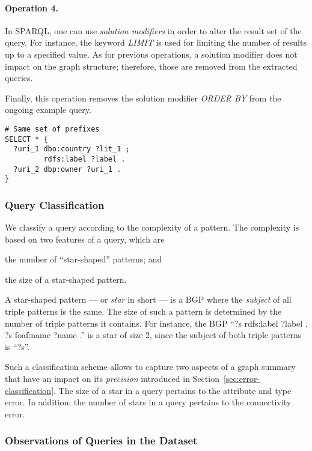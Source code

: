 \paragraph{Operation 4.}

In SPARQL, one can use \emph{solution modifiers} in order to alter the result set of the query. For instance, the keyword \emph{LIMIT} is used for limiting the number of results up to a specified value. As for previous operations, a solution modifier does not impact on the graph structure; therefore, those are removed from the extracted queries.

Finally, this operation removes the solution modifier \emph{ORDER BY} from the ongoing example query.
\begin{verbatim}
# Same set of prefixes
SELECT * {
  ?uri_1 dbo:country ?lit_1 ;
         rdfs:label ?label .
  ?uri_2 dbp:owner ?uri_1 .
}
\end{verbatim}

\subsubsection{Query Classification}

We classify a query according to the complexity of a pattern. The complexity is based on two features of a query, which are
\begin{inparaenum}[(i)]
	\item the number of ``star-shaped'' patterns; and
	\item the size of a star-shaped pattern.
\end{inparaenum}

A star-shaped pattern --- or \emph{star} in short --- is a BGP where the \emph{subject} of all triple patterns is the same. The size of such a pattern is determined by the number of triple patterns it contains. For instance, the BGP ``?s rdfs:label ?label . ?s foaf:name ?name .'' is a star of size 2, since the subject of both triple patterns is ``?s''.

Such a classification scheme allows to capture two aspects of a graph summary that have an impact on its \emph{precision} introduced in Section~\ref{sec:error-classification}. The size of a star in a query pertains to the attribute and type error. In addition, the number of stars in a query pertains to the \gls{connectivity} error.

\subsubsection{Observations of Queries in the Dataset}

